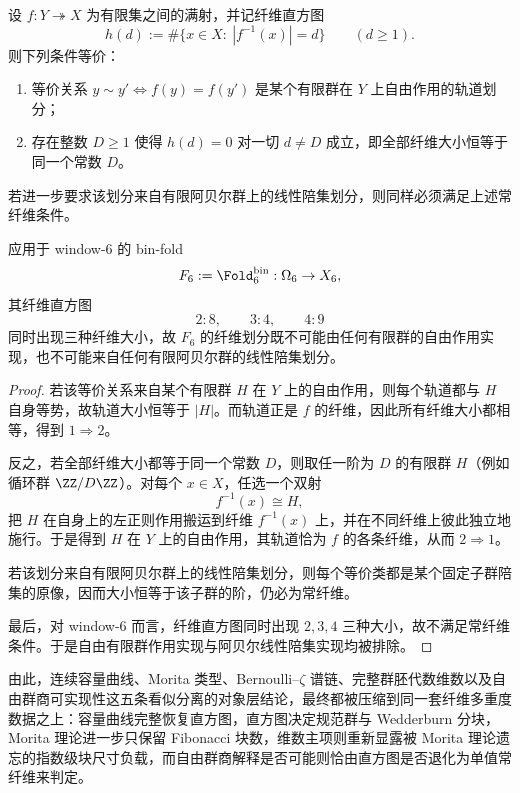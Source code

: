 \begin{theorem}[常纤维当且仅当自由有限群作用可实现]\label{thm:xi-time-part60acb-constant-fiber-free-group-action-criterion}
设 \(f:Y\twoheadrightarrow X\) 为有限集之间的满射，并记纤维直方图
\[
h(d):=\#\{x\in X:\ |f^{-1}(x)|=d\}
\qquad(d\ge 1).
\]
则下列条件等价：
\begin{enumerate}
  \item 等价关系 \(y\sim y'\iff f(y)=f(y')\) 是某个有限群在 \(Y\) 上自由作用的轨道划分；
  \item 存在整数 \(D\ge 1\) 使得 \(h(d)=0\) 对一切 \(d\neq D\) 成立，即全部纤维大小恒等于同一个常数 \(D\)。
\end{enumerate}
若进一步要求该划分来自有限阿贝尔群上的线性陪集划分，则同样必须满足上述常纤维条件。

应用于 window-\(6\) 的 bin-fold
\[
F_6:=\Fold_6^{\mathrm{bin}}:\Omega_6\to X_6,
\]
其纤维直方图
\[
2:8,\qquad 3:4,\qquad 4:9
\]
同时出现三种纤维大小，故 \(F_6\) 的纤维划分既不可能由任何有限群的自由作用实现，也不可能来自任何有限阿贝尔群的线性陪集划分。
\end{theorem}
\begin{proof}
若该等价关系来自某个有限群 \(H\) 在 \(Y\) 上的自由作用，则每个轨道都与 \(H\) 自身等势，故轨道大小恒等于 \(|H|\)。而轨道正是 \(f\) 的纤维，因此所有纤维大小都相等，得到 \(1\Rightarrow 2\)。

反之，若全部纤维大小都等于同一个常数 \(D\)，则取任一阶为 \(D\) 的有限群 \(H\)（例如循环群 \(\ZZ/D\ZZ\)）。对每个 \(x\in X\)，任选一个双射
\[
f^{-1}(x)\cong H,
\]
把 \(H\) 在自身上的左正则作用搬运到纤维 \(f^{-1}(x)\) 上，并在不同纤维上彼此独立地施行。于是得到 \(H\) 在 \(Y\) 上的自由作用，其轨道恰为 \(f\) 的各条纤维，从而 \(2\Rightarrow 1\)。

若该划分来自有限阿贝尔群上的线性陪集划分，则每个等价类都是某个固定子群陪集的原像，因而大小恒等于该子群的阶，仍必为常纤维。

最后，对 window-\(6\) 而言，纤维直方图同时出现 \(2,3,4\) 三种大小，故不满足常纤维条件。于是自由有限群作用实现与阿贝尔线性陪集实现均被排除。
\end{proof}

\noindent
由此，连续容量曲线、Morita 类型、Bernoulli--\(\zeta\) 谱链、完整群胚代数维数以及自由群商可实现性这五条看似分离的对象层结论，最终都被压缩到同一套纤维多重度数据之上：容量曲线完整恢复直方图，直方图决定规范群与 Wedderburn 分块，Morita 理论进一步只保留 Fibonacci 块数，维数主项则重新显露被 Morita 理论遗忘的指数级块尺寸负载，而自由群商解释是否可能则恰由直方图是否退化为单值常纤维来判定。

\endinput
